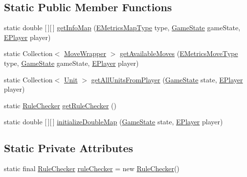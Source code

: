 \subsection*{Static Public Member Functions}
\begin{DoxyCompactItemize}
\item 
static double \mbox{[}$\,$\mbox{]}\mbox{[}$\,$\mbox{]} \mbox{\hyperlink{classanalyse_1_1_info_module_aff90c966df80003e7495ca1d74116024}{get\+Info\+Map}} (\mbox{\hyperlink{enumanalyse_1_1_e_metrics_map_type}{E\+Metrics\+Map\+Type}} type, \mbox{\hyperlink{classgame_1_1game_state_1_1_game_state}{Game\+State}} game\+State, \mbox{\hyperlink{enumgame_1_1_e_player}{E\+Player}} player)
\item 
static Collection$<$ \mbox{\hyperlink{classanalyse_1_1_move_wrapper}{Move\+Wrapper}} $>$ \mbox{\hyperlink{classanalyse_1_1_info_module_a6dfaaeb16de4ae73d9d0a72acc8817a0}{get\+Available\+Moves}} (\mbox{\hyperlink{enumanalyse_1_1_e_metrics_move_type}{E\+Metrics\+Move\+Type}} type, \mbox{\hyperlink{classgame_1_1game_state_1_1_game_state}{Game\+State}} game\+State, \mbox{\hyperlink{enumgame_1_1_e_player}{E\+Player}} player)
\item 
static Collection$<$ \mbox{\hyperlink{classgame_1_1board_1_1_unit}{Unit}} $>$ \mbox{\hyperlink{classanalyse_1_1_info_module_a502795470587e7a7b93af1f1fd7a470d}{get\+All\+Units\+From\+Player}} (\mbox{\hyperlink{classgame_1_1game_state_1_1_game_state}{Game\+State}} state, \mbox{\hyperlink{enumgame_1_1_e_player}{E\+Player}} player)
\item 
static \mbox{\hyperlink{classrule_engine_1_1_rule_checker}{Rule\+Checker}} \mbox{\hyperlink{classanalyse_1_1_info_module_a03bb959f532b214a07058127e528712b}{get\+Rule\+Checker}} ()
\item 
static double \mbox{[}$\,$\mbox{]}\mbox{[}$\,$\mbox{]} \mbox{\hyperlink{classanalyse_1_1_info_module_a0693c1b360ceaad897107c41bddb1576}{initialize\+Double\+Map}} (\mbox{\hyperlink{classgame_1_1game_state_1_1_game_state}{Game\+State}} state, \mbox{\hyperlink{enumgame_1_1_e_player}{E\+Player}} player)
\end{DoxyCompactItemize}
\subsection*{Static Private Attributes}
\begin{DoxyCompactItemize}
\item 
static final \mbox{\hyperlink{classrule_engine_1_1_rule_checker}{Rule\+Checker}} \mbox{\hyperlink{classanalyse_1_1_info_module_a631d23ab7ccd9f448bc34256144f2990}{rule\+Checker}} = new \mbox{\hyperlink{classrule_engine_1_1_rule_checker}{Rule\+Checker}}()
\end{DoxyCompactItemize}


